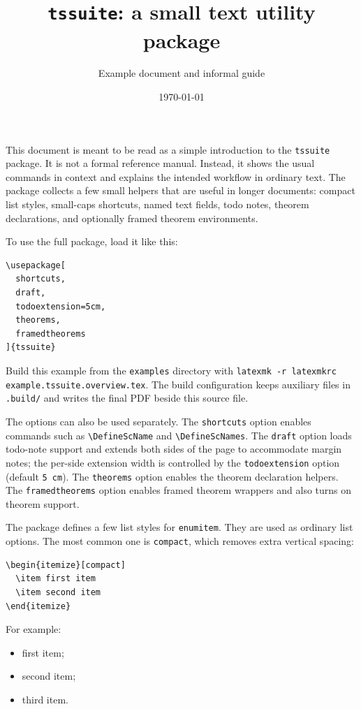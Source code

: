 \documentclass[a4paper,11pt]{article}
\title{\texttt{tssuite}: a small text utility package}
\author{Example document and informal guide}
\date{\today}
\newcommand{\pkg}[1]{\texttt{#1}}
\begin{document}
\maketitle

This document is meant to be read as a simple introduction to the
\pkg{tssuite} package.  It is not a formal reference manual.  Instead, it shows
the usual commands in context and explains the intended workflow in ordinary
text.  The package collects a few small helpers that are useful in longer
documents: compact list styles, small-caps shortcuts, named text fields, todo
notes, theorem declarations, and optionally framed theorem environments.

To use the full package, load it like this:

\begin{verbatim}
\usepackage[
  shortcuts,
  draft,
  todoextension=5cm,
  theorems,
  framedtheorems
]{tssuite}
\end{verbatim}

Build this example from the \texttt{examples} directory with
\texttt{latexmk -r latexmkrc example.tssuite.overview.tex}.  The build configuration keeps
auxiliary files in \texttt{.build/} and writes the final PDF beside this source
file.

The options can also be used separately.  The \verb|shortcuts| option enables
commands such as \verb|\DefineScName| and \verb|\DefineScNames|.  The
\verb|draft| option loads todo-note support and extends both sides of the page
to accommodate margin notes; the per-side extension width is controlled by the
\verb|todoextension| option (default \texttt{5\,cm}).  The \verb|theorems|
option enables the theorem declaration helpers.  The \verb|framedtheorems|
option enables framed theorem wrappers and also turns on theorem support.

The package defines a few list styles for \pkg{enumitem}.  They are used as
ordinary list options.  The most common one is \verb|compact|, which removes
extra vertical spacing:

\begin{verbatim}
\begin{itemize}[compact]
  \item first item
  \item second item
\end{itemize}
\end{verbatim}

For example:

\begin{itemize}[compact]
  \item first item;
  \item second item;
  \item third item.
\end{itemize}
\end{document}
